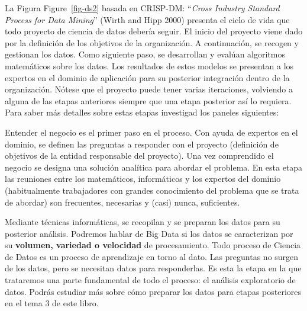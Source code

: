 \documentclass[
  letterpaper,
  DIV=11,
  numbers=noendperiod]{scrreprt}
\begin{document}
La Figura Figure~\ref{fig-ds2} basada en CRISP-DM: ``\emph{Cross
Industry Standard Process for Data Mining}'' (Wirth and Hipp 2000)
presenta el ciclo de vida que todo proyecto de ciencia de datos debería
seguir. El inicio del proyecto viene dado por la definición de los
objetivos de la organización. A continuación, se recogen y gestionan los
datos. Como siguiente paso, se desarrollan y evalúan algoritmos
matemáticos sobre los datos. Los resultados de estos modelos se
presentan a los expertos en el dominio de aplicación para su posterior
integración dentro de la organización. Nótese que el proyecto puede
tener varias iteraciones, volviendo a alguna de las etapas anteriores
siempre que una etapa posterior así lo requiera. Para saber más detalles
sobre estas etapas investigad los paneles siguientes:

\begin{tcolorbox}[enhanced jigsaw, arc=.35mm, breakable, coltitle=black, left=2mm, opacityback=0, bottomtitle=1mm, colbacktitle=quarto-callout-note-color!10!white, title=\textcolor{quarto-callout-note-color}{\faInfo}\hspace{0.5em}{Definir objetivos}, titlerule=0mm, colback=white, colframe=quarto-callout-note-color-frame, bottomrule=.15mm, rightrule=.15mm, opacitybacktitle=0.6, toptitle=1mm, toprule=.15mm, leftrule=.75mm]

Entender el negocio es el primer paso en el proceso. Con ayuda de
expertos en el dominio, se definen las preguntas a responder con el
proyecto (definición de objetivos de la entidad responsable del
proyecto). Una vez comprendido el negocio se designa una solución
analítica para abordar el problema. En esta etapa las reuniones entre
los matemáticos, informáticos y los expertos del dominio (habitualmente
trabajadores con grandes conocimiento del problema que se trata de
abordar) son frecuentes, necesarias y (casi) nunca, suficientes.

\end{tcolorbox}

\begin{tcolorbox}[enhanced jigsaw, arc=.35mm, breakable, coltitle=black, left=2mm, opacityback=0, bottomtitle=1mm, colbacktitle=quarto-callout-note-color!10!white, title=\textcolor{quarto-callout-note-color}{\faInfo}\hspace{0.5em}{Obtener, preparar y gestionar los datos}, titlerule=0mm, colback=white, colframe=quarto-callout-note-color-frame, bottomrule=.15mm, rightrule=.15mm, opacitybacktitle=0.6, toptitle=1mm, toprule=.15mm, leftrule=.75mm]

Mediante técnicas informáticas, se recopilan y se preparan los datos
para su posterior análisis. Podremos hablar de Big Data si los datos se
caracterizan por su \textbf{volumen, variedad o velocidad} de
procesamiento. Todo proceso de Ciencia de Datos es un proceso de
aprendizaje en torno al dato. Las preguntas no surgen de los datos, pero
se necesitan datos para responderlas. Es esta la etapa en la que
trataremos una parte fundamental de todo el proceso: el análisis
exploratorio de datos. Podrás estudiar más sobre cómo preparar los datos
para etapas posteriores en el tema 3 de este libro.

\end{tcolorbox}
\end{document}
